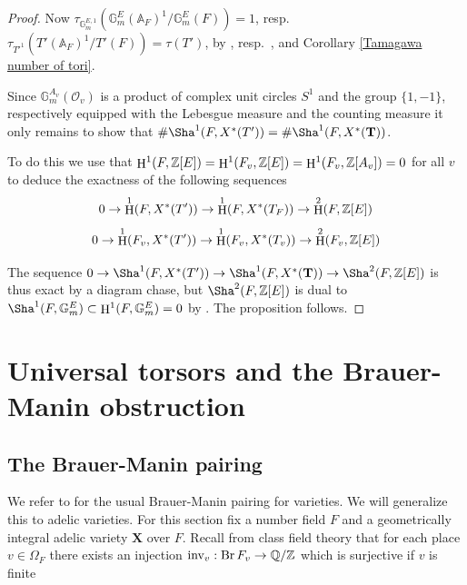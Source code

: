 \documentclass[a4paper,11pt,reqno]{amsart}
\newcommand{\Q}{\mathbb{Q}}
\newcommand{\G}{\mathbb{G}}
\newcommand{\A}{\mathbb{A}}
\DeclareMathOperator{\Br}{Br}
\DeclareMathOperator{\HH}{H}
\theoremstyle{definition}
\begin{document}
\begin{proof}
Now $\tau_{\G_m^{E,1}}\left(\G_m^E(\A_F)^1/\G_m^E(F)\right) = 1$, resp. $\tau_{T'^1}\left(T'(\A_F)^1/T'(F)\right) = \tau(T')$, by \cite[Thm. ~3.5.1]{Ono191Arithmetic}, resp.~\cite[Main Thm.]{Ono1963Tamagawa}, and Corollary \ref{Tamagawa number of tori}. 

Since $\G_m^{A_v}(\mathcal{O}_v)$ is a product of complex unit circles $S^1$ and the group $\{1,-1\}$, respectively equipped with the Lebesgue measure and the counting measure it only remains to show that $\# \Sha^1(F, X^*(T')) = \# \Sha^1(F, X^*(\mathbf{T}))$.

To do this we use that $\HH^1(F, \Z[E]) = \HH^1(F_v, \Z[E]) = \HH^1(F_v, \Z[A_v]) = 0$ for all $v$ to deduce the exactness of the following sequences 
\[
0 \to \HH^1(F, X^*(T')) \to \HH^1(F, X^*(T_F)) \to \HH^2(F, \Z[E])
\]
\[
0 \to \HH^1(F_v, X^*(T')) \to \HH^1(F_v, X^*(T_v)) \to \HH^2(F_v, \Z[E])
\]

The sequence $0 \to \Sha^1(F, X^*(T')) \to \Sha^1(F, X^*(\mathbf{T})) \to \Sha^2(F, \Z[E])$ is thus exact by a diagram chase, but $\Sha^2(F, \Z[E])$ is dual to $\Sha^1(F, \G_m^E) \subset \HH^1(F, \G_m^E) = 0$ by \cite[Thm.~8.6.7]{Neukirch2008Cohomology}. The proposition follows.
\end{proof}
\section{Universal torsors and the Brauer-Manin obstruction}
\subsection{The Brauer-Manin pairing}
We refer to \cite[\S 13]{Colliot2021Brauer} for the usual Brauer-Manin pairing for varieties. We will generalize this to adelic varieties. For this section fix a number field $F$ and a geometrically integral adelic variety $\mathbf{X}$ over $F$. Recall from class field theory that for each place $v \in \Omega_F$ there exists an injection $\text{inv}_v: \Br F_v \to \Q/\Z$ which is surjective if $v$ is finite
\end{document}
